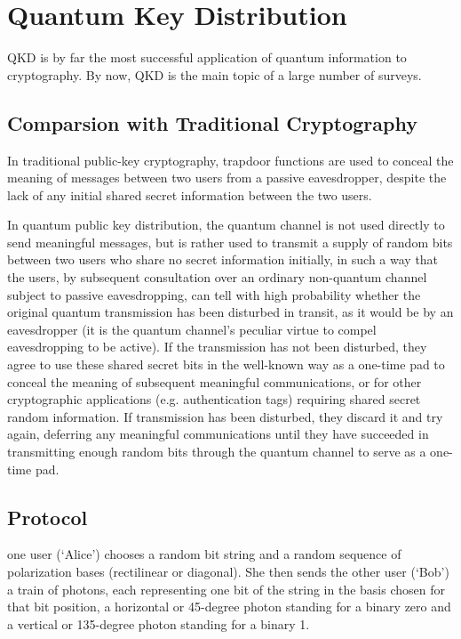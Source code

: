 \chapter{Quantum Key Distribution}
\label{chap:Quantum Key Distribution}

QKD is by far the most successful application of quantum information to cryptography. By now, QKD is the main topic of a large number of surveys.


\section{Comparsion with Traditional Cryptography}
In traditional public-key cryptography, trapdoor functions are used to conceal the meaning of messages between two users from a passive eavesdropper, despite the lack of any initial shared secret information between the two users. 

In quantum public key distribution, the quantum channel is not used directly to send meaningful messages, but is rather used to transmit a supply of random bits between two users who share no secret information initially, in such a way that the users, by subsequent consultation over an ordinary non-quantum channel subject to passive eavesdropping, can tell with high probability whether the original quantum transmission has been disturbed in transit, as it would be by an eavesdropper (it is the quantum channel’s peculiar virtue to compel eavesdropping to be active). If the transmission has not been disturbed, they agree to use these shared secret bits in the well-known way as a one-time pad to conceal the meaning of subsequent meaningful communications, or for other cryptographic applications (e.g. authentication tags) requiring shared secret random information. If transmission has been disturbed, they discard it and try again, deferring any meaningful communications until they have succeeded in transmitting enough random bits through the quantum channel to serve as a one-time pad.

\section{Protocol}
one user (‘Alice’) chooses a random bit string and a random sequence of polarization bases (rectilinear or diagonal). She then sends the other user (‘Bob’) a train of photons, each representing one bit of the string in the basis chosen for that bit position, a horizontal or 45-degree photon standing for a binary zero and a vertical or 135-degree photon standing for a binary 1. 

